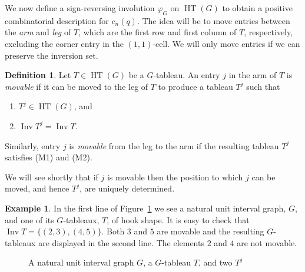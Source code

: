 \documentclass[12pt]{amsart}  %
\theoremstyle{definition}
\newtheorem{definition}[theorem]{Definition}
\newtheorem{example}[theorem]{Example}
\theoremstyle{remark}
\numberwithin{equation}{section}
\DeclareMathOperator{\Inv}{Inv}
\DeclareMathOperator{\HT}{HT}
\newlength\cellsize \setlength\cellsize{15\unitlength}
\newcommand\cellify[1]{\def\thearg{#1}\def\nothing{}%
\ifx\thearg\nothing
\vrule width0pt height\cellsize depth0pt\else
\hbox to 0pt{\usebox2\hss}\fi%
\vbox to 15\unitlength{
\vss
\hbox to 15\unitlength{\hss$#1$\hss}
\vss}}
\newcommand\tableau[1]{\vtop{\let\\=\cr
\setlength\baselineskip{-16000pt}
\setlength\lineskiplimit{16000pt}
\setlength\lineskip{0pt}
\halign{&\cellify{##}\cr#1\crcr}}}
\begin{document}
We now define a sign-reversing involution $\varphi_G$ on $\HT(G)$ to obtain a positive combinatorial description for $c_n(q)$. The idea will be to move entries between the \emph{arm} and \emph{leg} of $T$, which are the first row and first column of $T$, respectively, excluding the corner entry in the $(1,1)$-cell. We will only move entries if we can preserve the inversion set.

\begin{definition}
Let $T\in\HT(G)$ be a $G$-tableau. An entry $j$ in the arm of $T$ is \emph{movable} if it can be moved to the leg of $T$ to produce a tableau 
$T^j$ such that
\begin{enumerate}
    \item[(M1)] $T^j\in\HT(G)$, and
    \item[(M2)] $\Inv T^j=\Inv T$.
\end{enumerate}
Similarly,  entry $j$ is {\em movable} from the leg to the arm if the resulting tableau $T^j$ satisfies (M1) and (M2).

\end{definition}

We will see shortly that if $j$ is movable then the position to which $j$ can be moved, and hence $T^j$, are uniquely determined.

\begin{example}

In the first line of Figure~\ref{move} we see a natural unit interval graph, $G$, and one of its $G$-tableaux, $T$, of hook shape.  It is easy to check that $\Inv T =\{ (2,3), (4,5)\}$.  Both $3$ and $5$ are movable and the resulting $G$-tableaux are displayed in the second line.  The elements $2$ and $4$ are not 
movable.

\end{example}

\begin{figure}
\begin{center}
\end{center}
\caption{\label{move} A natural unit interval graph $G$, a $G$-tableau $T$, and two $T^j$}
\end{figure}
\end{document}
